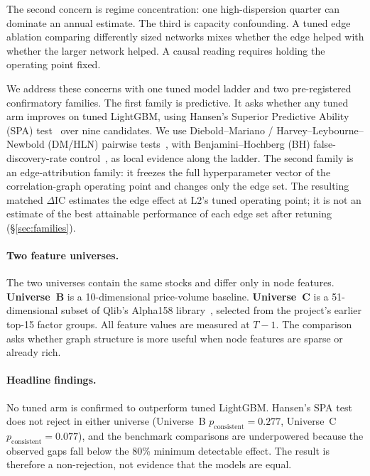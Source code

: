 \documentclass[sigconf,nonacm]{acmart}
\begin{document}
The second concern is regime concentration: one high-dispersion quarter can dominate an annual estimate. The third is capacity confounding. A tuned edge ablation comparing differently sized networks mixes whether the edge helped with whether the larger network helped. A causal reading requires holding the operating point fixed.

We address these concerns with one tuned model ladder and two pre-registered confirmatory families. The first family is predictive. It asks whether any tuned arm improves on tuned LightGBM, using Hansen's Superior Predictive Ability (SPA) test~\cite{hansen2005spa} over nine candidates. We use Diebold--Mariano / Harvey--Leybourne--Newbold (DM/HLN) pairwise tests~\cite{diebold1995comparing,harvey1997testing}, with Benjamini--Hochberg (BH) false-discovery-rate control~\cite{benjamini1995controlling}, as local evidence along the ladder. The second family is an edge-attribution family: it freezes the full hyperparameter vector of the correlation-graph operating point and changes only the edge set. The resulting matched $\Delta$IC estimates the edge effect at L2's tuned operating point; it is not an estimate of the best attainable performance of each edge set after retuning (\S\ref{sec:families}).

\paragraph{Two feature universes.} The two universes contain the same stocks and differ only in node features. \textbf{Universe~B} is a 10-dimensional price-volume baseline. \textbf{Universe~C} is a 51-dimensional subset of Qlib's Alpha158 library~\cite{yang2020qlib}, selected from the project's earlier top-15 factor groups. All feature values are measured at $T-1$. The comparison asks whether graph structure is more useful when node features are sparse or already rich.

\paragraph{Headline findings.} No tuned arm is confirmed to outperform tuned LightGBM. Hansen's SPA test does not reject in either universe (Universe~B $p_{\text{consistent}}=0.277$, Universe~C $p_{\text{consistent}}=0.077$), and the benchmark comparisons are underpowered because the observed gaps fall below the 80\% minimum detectable effect. The result is therefore a non-rejection, not evidence that the models are equal.
\end{document}
